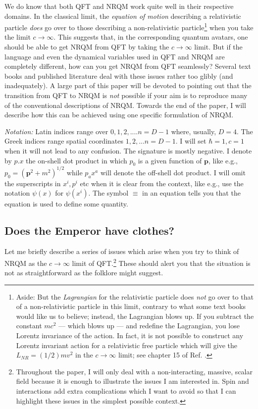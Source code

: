 \documentclass{article}
\begin{document}
We do know that  both QFT and NRQM work quite well in their  respective domains. In the classical limit, the \textit{equation of motion} describing a relativistic particle \textit{does} go over to those describing a non-relativistic particle\footnote{Aside: But the \textit{Lagrangian} for the relativistic particle does \textit{not} go over to that of a non-relativistic particle in this limit, contrary to what some text books would like us to believe; instead, the Lagrangian  blows up. If you subtract  the constant $mc^2$ --- which blows up --- and redefine the Lagrangian, you lose Lorentz invariance of the action. In fact, it is not possible to construct any Lorentz invariant action for a relativistic free particle which will give the $L_{NR}=(1/2)mv^2$ in the $c\to \infty$ limit; see chapter 15 of Ref. \cite{tpsbtp}.} when you take the limit $c\to \infty$. This suggests that, in the corresponding quantum avatars,  one should be able to get NRQM from QFT by taking the $c\to \infty$ limit. 
But if the language and even the dynamical variables used in QFT and NRQM are completely different, how can you get NRQM from QFT seamlessly?
 Several text books and published literature deal with these issues rather too glibly (and inadequately).   A large part of this paper will be devoted to pointing out that the transition from QFT to NRQM is \textit{not} possible if your aim is to reproduce many of the conventional descriptions of NRQM. Towards the end of the paper, I will describe how this can be achieved using one specific formulation of NRQM.
 
\textit{ Notation:} Latin indices range over $0,1,2,....n=D-1$ where, usually, $D=4$. The Greek indices range spatial coordinates $1,2,...n=D-1$. I will set $\hbar=1, c=1$ when it will not lead to any confusion. The signature is mostly negative. I denote by $p.x$ the on-shell dot product in which $p_0$ is a given function of $\bm{p}$, like e.g., $p_0=(\bm{p}^2+m^2)^{1/2}$ while $p_ax^a$ will denote the off-shell dot product. I will omit the superscripts in $x^i,p^i$ etc when it is clear from the context, like e.g., use the notation $\psi(x)$ for $\psi(x^i)$. 
The symbol $\equiv$ in an equation tells you that the equation is used to define some quantity.
 
 \subsection{Does the Emperor have clothes?}\label{sec:emperor}
 
Let me briefly describe a series of issues which arise when you try to think of NRQM as the $c\to\infty$ limit of QFT.\footnote{Throughout the paper, I will only deal with a non-interacting, massive, scalar field because it is enough to illustrate the issues I am interested in. Spin and interactions add extra complications which I want to avoid so that I can highlight these issues in the simplest possible context.} These should alert you that the situation is not as straightforward as the folklore might suggest. 
 
\end{document}

